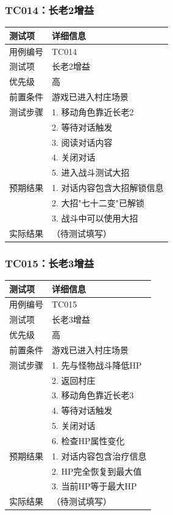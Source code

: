 \documentclass[a4paper,12pt]{article}
\begin{document}
\subsubsection{TC014：长老2增益}
\begin{table}[h]
\centering
\begin{tabular}{ll}
\toprule
测试项 & 详细信息 \\
\midrule
用例编号 & TC014 \\
测试项 & 长老2增益 \\
优先级 & 高 \\
前置条件 & 游戏已进入村庄场景 \\
测试步骤 & 1. 移动角色靠近长老2 \\
 & 2. 等待对话触发 \\
 & 3. 阅读对话内容 \\
 & 4. 关闭对话 \\
 & 5. 进入战斗测试大招 \\
预期结果 & 1. 对话内容包含大招解锁信息 \\
 & 2. 大招"七十二变"已解锁 \\
 & 3. 战斗中可以使用大招 \\
实际结果 & （待测试填写） \\
\bottomrule
\end{tabular}
\end{table}

\subsubsection{TC015：长老3增益}
\begin{table}[h]
\centering
\begin{tabular}{ll}
\toprule
测试项 & 详细信息 \\
\midrule
用例编号 & TC015 \\
测试项 & 长老3增益 \\
优先级 & 高 \\
前置条件 & 游戏已进入村庄场景 \\
测试步骤 & 1. 先与怪物战斗降低HP \\
 & 2. 返回村庄 \\
 & 3. 移动角色靠近长老3 \\
 & 4. 等待对话触发 \\
 & 5. 关闭对话 \\
 & 6. 检查HP属性变化 \\
预期结果 & 1. 对话内容包含治疗信息 \\
 & 2. HP完全恢复到最大值 \\
 & 3. 当前HP等于最大HP \\
实际结果 & （待测试填写） \\
\bottomrule
\end{tabular}
\end{table}
\end{document}
